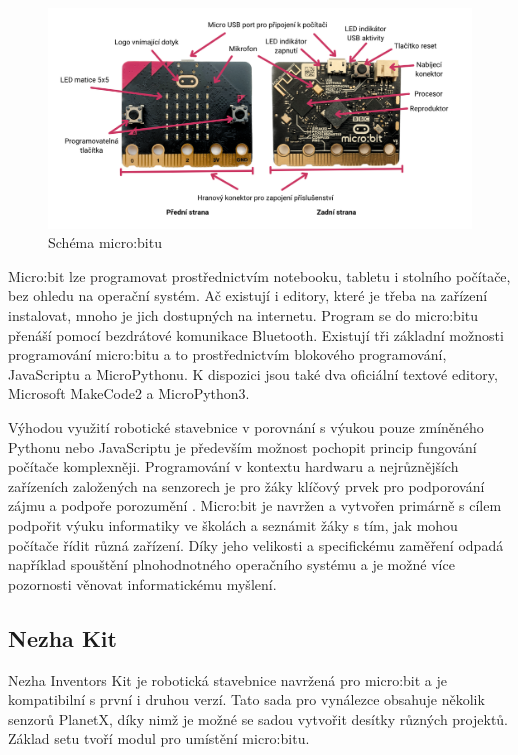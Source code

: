 \documentclass[
  digital,     %
  oneside,     %
  nosansbold,  %
  colorbold, %
  lof,         %
  nolot,         %
]{fithesis4}
\begin{document}
\begin{figure}
    \centering
    \includegraphics[width=\textwidth] {images/microbit.png}
    \caption{Schéma micro:bitu}
    \label{microbit}
\end{figure}

Micro:bit lze programovat prostřednictvím notebooku, tabletu i stolního počítače, bez ohledu na operační systém. Ač existují i editory, které je třeba na zařízení instalovat, mnoho je jich dostupných na internetu. Program se do micro:bitu přenáší pomocí bezdrátové komunikace Bluetooth. Existují tři základní možnosti programování micro:bitu a to prostřednictvím blokového programování, JavaScriptu a MicroPythonu. K dispozici jsou také dva oficiální textové editory, Microsoft MakeCode2 a MicroPython3.

Výhodou využití robotické stavebnice v porovnání s výukou pouze zmíněného Pythonu nebo JavaScriptu je především možnost pochopit princip fungování počítače komplexněji. Programování v kontextu hardwaru a nejrůznějších zařízeních založených na senzorech je pro žáky klíčový prvek pro podporování zájmu a podpoře porozumění  \cite{Sentance17}. Micro:bit je navržen a vytvořen primárně s cílem podpořit výuku informatiky ve školách a seznámit žáky s tím, jak mohou počítače řídit různá zařízení. Díky jeho velikosti a specifickému zaměření odpadá například spouštění plnohodnotného operačního systému a je možné více pozornosti věnovat informatickému myšlení.

\subsection{Nezha Kit}
Nezha Inventors Kit je robotická stavebnice navržená pro micro:bit a je kompatibilní s první i druhou verzí. Tato sada pro vynálezce obsahuje několik senzorů PlanetX, díky nimž je možné se sadou vytvořit desítky různých projektů. Základ setu tvoří modul pro umístění micro:bitu. 
\end{document}
